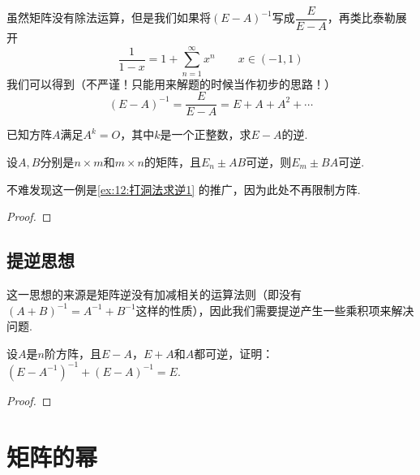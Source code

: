 虽然矩阵没有除法运算，但是我们如果将$(E-A)^{-1}$写成$\dfrac{E}{E-A}$，再类比泰勒展开
\[\frac{1}{1-x}=1+\sum_{n=1}^\infty x^n \qquad x\in (-1,1)\]
我们可以得到（不严谨！只能用来解题的时候当作初步的思路！）
\[(E-A)^{-1}=\frac{E}{E-A}=E+A+A^2+\cdots\]

\begin{example}
    已知方阵$A$满足$A^k=O$，其中$k$是一个正整数，求$E-A$的逆.
\end{example}

\begin{solution}

\end{solution}

\begin{example}
    设$A,B$分别是$n \times m$和$m \times n$的矩阵，且$E_n \pm AB$可逆，则$E_m \pm BA$可逆.
\end{example}
不难发现这一例是\autoref{ex:12:打洞法求逆1} 的推广，因为此处不再限制方阵.

\begin{proof}

\end{proof}

\subsection{提逆思想}

这一思想的来源是矩阵逆没有加减相关的运算法则（即没有$(A+B)^{-1}=A^{-1}+B^{-1}$这样的性质），因此我们需要提逆产生一些乘积项来解决问题.
\begin{example}
    设$A$是$n$阶方阵，且$E-A$，$E+A$和$A$都可逆，证明：$(E-A^{-1})^{-1}+(E-A)^{-1}=E$.
\end{example}

\begin{proof}

\end{proof}

\section{矩阵的幂} \label{sec:12:矩阵的幂}

